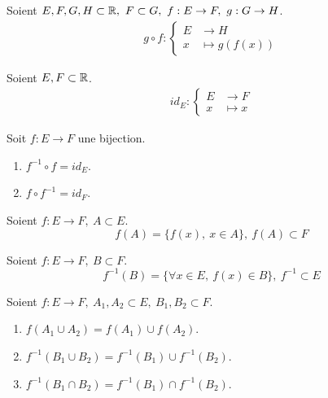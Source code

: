 \begin{definition}
	Soient $E, F, G, H \subset \mathbb{R},\ F \subset G,\ f : E \to F,\ g : G \to H$.
	\begin{align*}
		g \circ f : 
        \begin{cases}
            E &\to H \\
		            x &\mapsto g(f(x))
        \end{cases}
	\end{align*}
\end{definition}

\begin{definition}
    Soient $E, F \subset \mathbb{R}$.
	\begin{align*}
		id_E : 
        \begin{cases}
            E &\to F \\
		       x &\mapsto x
        \end{cases}
	\end{align*}
\end{definition}

\begin{proposition}
	Soit $f : E \to F$ une bijection.
    \begin{multicols}{2}
        \begin{enumerate}
            \item $f^{-1} \circ f = id_E$.
            \item $f \circ f^{-1} = id_F$.
        \end{enumerate}
    \end{multicols}
\end{proposition}

\begin{definition}
    Soient $f : E \to F,\ A \subset E$.
	\[ f(A) = \{ f(x),\ x \in A \},\ f(A) \subset F \]
\end{definition}

\begin{definition}
	Soient $f : E \to F,\ B \subset F$.
	\[ f^{-1}(B) = \{ \forall x \in E,\ f(x) \in B \},\ f^{-1} \subset E \]
\end{definition}

\begin{proposition}
    Soient $f : E \to F,\ A_1, A_2 \subset E,\ B_1, B_2 \subset F$.
    \begin{enumerate}
        \item $f(A_1 \cup A_2) = f(A_1) \cup f(A_2)$.
        \item $f^{-1} (B_1 \cup B_2) = f^{-1} (B_1) \cup f^{-1} (B_2)$.
        \item $f^{-1} (B_1 \cap B_2) = f^{-1} (B_1) \cap f^{-1} (B_2)$.
    \end{enumerate}
\end{proposition} 


